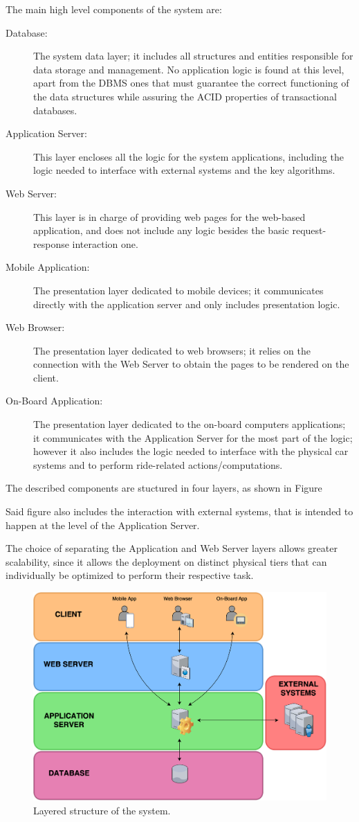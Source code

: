The main high level components of the system are:

\begin{description}
\item[Database:] The system data layer; it includes all structures and entities responsible for data storage and management. No application logic is found at this level, apart from the DBMS ones that must guarantee the correct functioning of the data structures while assuring the ACID properties of transactional databases.
\item[Application Server:] This layer encloses all the logic for the system applications, including the logic needed to interface with external systems and the key algorithms.
\item[Web Server:] This layer is in charge of providing web pages for the web-based application, and does not include any logic besides the basic request-response interaction one.
\item[Mobile Application:] The presentation layer dedicated to mobile devices; it communicates directly with the application server and only includes presentation logic.
\item[Web Browser:] The presentation layer dedicated to web browsers; it relies on the connection with the Web Server to obtain the pages to be rendered on the client.
\item[On-Board Application:] The presentation layer dedicated to the on-board computers applications; it communicates with the Application Server for the most part of the logic; however it also includes the logic needed to interface with the physical car systems and to perform ride-related actions/computations.
\end{description}

The described components are stuctured in four layers, as shown in Figure %

Said figure also includes the interaction with external systems, that is intended to happen at the level of the Application Server.

The choice of separating the Application and Web Server layers allows greater scalability, since it allows the deployment on distinct physical tiers that can individually be optimized to perform their respective task.

\begin{figure}[H]
\begin{center}
		\includegraphics[width=\textwidth]{./arch_design/diagrams/system_layers.png}
		\caption{Layered structure of the system.}
\end{center}
\end{figure}